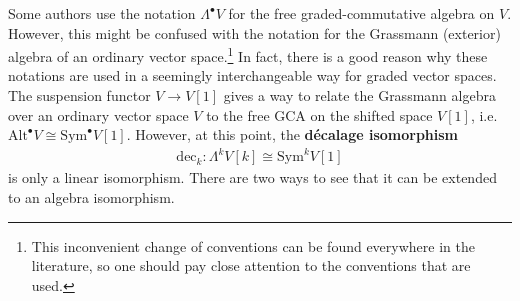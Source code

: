     \begin{remark}\label{hda:decalage}
        Some authors use the notation $\Lambda^\bullet V$ for the free graded-commutative algebra on $V$. However, this might be confused with the notation for the Grassmann (exterior) algebra of an ordinary vector space.\footnote{This inconvenient change of conventions can be found everywhere in the literature, so one should pay close attention to the conventions that are used.} In fact, there is a good reason why these notations are used in a seemingly interchangeable way for graded vector spaces. The suspension functor $V\rightarrow V[1]$ gives a way to relate the Grassmann algebra over an ordinary vector space $V$ to the free GCA on the shifted space $V[1]$, i.e. $\text{Alt}^\bullet V\cong\text{Sym}^\bullet V[1]$. However, at this point, the \textbf{d\'ecalage isomorphism}
        \begin{gather}
            \text{dec}_k:\Lambda^k V[k]\cong\text{Sym}^kV[1]
        \end{gather}
        is only a linear isomorphism. There are two ways to see that it can be extended to an algebra isomorphism.


\end{remark}
